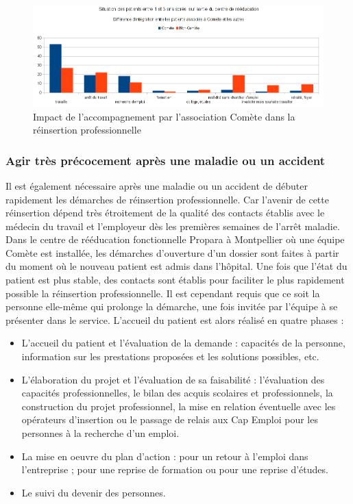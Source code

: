 \begin{figure}[H]
\includegraphics[scale=0.6]{figures/difference_integration.png}
\centering
\caption{Impact de l'accompagnement par l'association Comète dans la réinsertion professionnelle}
\end{figure}




\subsubsection{Agir très précocement après une maladie ou un accident}

Il est également nécessaire après une maladie ou un accident de débuter rapidement les démarches de réinsertion professionnelle. Car l'avenir de cette réinsertion dépend très étroitement de la qualité des contacts établis avec le médecin du travail et l'employeur dès les premières semaines de l'arr\^et maladie.\\

Dans le centre de rééducation fonctionnelle Propara à Montpellier où une équipe Comète est installée, les démarches d'ouverture d'un dossier sont faites à partir du moment où le nouveau patient est admis dans l'h\^opital. Une fois que l'état du patient est plus stable, des contacts sont établis pour faciliter le plus rapidement possible la réinsertion professionnelle. Il est cependant requis que ce soit la personne elle-même qui prolonge la démarche, une fois invitée par l'équipe à se présenter dans le service. L'accueil du patient est alors réalisé en quatre phases :
\begin{itemize}
\item L'accueil du patient et l'évaluation de la demande : capacités de la personne, information sur les prestations proposées et les solutions possibles, etc.
\item L'élaboration du projet et l'évaluation de sa faisabilité : l'évaluation des capacités professionnelles, le bilan des acquis scolaires et professionnels, la construction du projet professionnel, la mise en relation éventuelle avec les opérateurs d'insertion ou le passage de relais aux Cap Emploi pour les personnes à la recherche d'un emploi.
\item La mise en oeuvre du plan d'action : pour un retour à l'emploi dans l'entreprise ; pour une reprise de formation ou pour une reprise d'études.
\item Le suivi du devenir des personnes.\\
\end{itemize}
